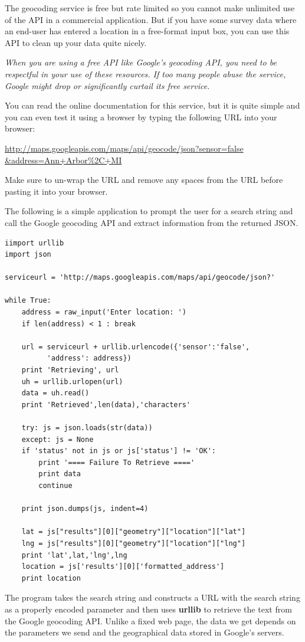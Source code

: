 \documentclass[11pt]{book}
\begin{document}
The geocoding service is free but rate limited so you cannot make unlimited
use of the API in a commercial application.   But if you have some survey data
where an end-user has entered a location in a free-format input box, you can use
this API to clean up your data quite nicely.  

{\em When you are using a free API like Google's geocoding API, you need
to be respectful in your use of these resources.  If too many people abuse the
service, Google might drop or significantly curtail its free service.}

You can read the online documentation for this service, but it is quite simple
and you can even test it using a browser by typing the following URL into your 
browser:

\url{http://maps.googleapis.com/maps/api/geocode/json?sensor=false &address=Ann+Arbor%2C+MI}

Make sure to un-wrap the URL and remove any spaces from the URL before pasting
it into your browser.

The following is a simple application to prompt the user for a search string
and call the Google geocoding API and extract information from the returned
JSON.

\beforeverb
\begin{verbatim}
iimport urllib
import json

serviceurl = 'http://maps.googleapis.com/maps/api/geocode/json?'

while True:
    address = raw_input('Enter location: ')
    if len(address) < 1 : break

    url = serviceurl + urllib.urlencode({'sensor':'false', 
          'address': address})
    print 'Retrieving', url
    uh = urllib.urlopen(url)
    data = uh.read()
    print 'Retrieved',len(data),'characters'

    try: js = json.loads(str(data))
    except: js = None
    if 'status' not in js or js['status'] != 'OK':
        print '==== Failure To Retrieve ===='
        print data
        continue

    print json.dumps(js, indent=4)

    lat = js["results"][0]["geometry"]["location"]["lat"]
    lng = js["results"][0]["geometry"]["location"]["lng"]
    print 'lat',lat,'lng',lng
    location = js['results'][0]['formatted_address']
    print location
\end{verbatim}
\afterverb
%
The program takes the search string and constructs a URL with the
search string as a properly encoded parameter and then uses
{\bf urllib} to retrieve the text from the Google geocoding API.
Unlike a fixed web page, the data we get depends on the parameters
we send and the geographical data stored in Google's servers.
\end{document}
